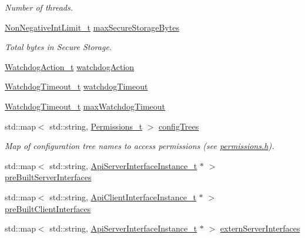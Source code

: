\begin{DoxyCompactItemize}
\begin{DoxyCompactList}\small\item\em Number of threads. \end{DoxyCompactList}\item 
\hyperlink{classmodel_1_1_non_negative_int_limit__t}{Non\+Negative\+Int\+Limit\+\_\+t} \hyperlink{structmodel_1_1_app__t_ad6a52e97dd3d0bf9b5704b1132887250}{max\+Secure\+Storage\+Bytes}
\begin{DoxyCompactList}\small\item\em Total bytes in Secure Storage. \end{DoxyCompactList}\item 
\hyperlink{classmodel_1_1_watchdog_action__t}{Watchdog\+Action\+\_\+t} \hyperlink{structmodel_1_1_app__t_a8de51fb11e6a6a74b85e1251b04ee0d0}{watchdog\+Action}
\item 
\hyperlink{classmodel_1_1_watchdog_timeout__t}{Watchdog\+Timeout\+\_\+t} \hyperlink{structmodel_1_1_app__t_ab1f362e168c428268f8cbf63b1fa4b49}{watchdog\+Timeout}
\item 
\hyperlink{classmodel_1_1_watchdog_timeout__t}{Watchdog\+Timeout\+\_\+t} \hyperlink{structmodel_1_1_app__t_a44607babc90ee42d69af83bfc57ad8e0}{max\+Watchdog\+Timeout}
\item 
std\+::map$<$ std\+::string, \hyperlink{structmodel_1_1_permissions__t}{Permissions\+\_\+t} $>$ \hyperlink{structmodel_1_1_app__t_a8465070467987d12cc3bdca51790503e}{config\+Trees}
\begin{DoxyCompactList}\small\item\em Map of configuration tree names to access permissions (see \hyperlink{permissions_8h}{permissions.\+h}). \end{DoxyCompactList}\item 
std\+::map$<$ std\+::string, \hyperlink{structmodel_1_1_api_server_interface_instance__t}{Api\+Server\+Interface\+Instance\+\_\+t} $\ast$ $>$ \hyperlink{structmodel_1_1_app__t_a899c9e3a6bbb06ebf0d174be423792ec}{pre\+Built\+Server\+Interfaces}
\item 
std\+::map$<$ std\+::string, \hyperlink{structmodel_1_1_api_client_interface_instance__t}{Api\+Client\+Interface\+Instance\+\_\+t} $\ast$ $>$ \hyperlink{structmodel_1_1_app__t_ae73e4308135b01391bacc2ff355de163}{pre\+Built\+Client\+Interfaces}
\item 
std\+::map$<$ std\+::string, \hyperlink{structmodel_1_1_api_server_interface_instance__t}{Api\+Server\+Interface\+Instance\+\_\+t} $\ast$ $>$ \hyperlink{structmodel_1_1_app__t_a27a2337b25bc501f7b52913bd95dd570}{extern\+Server\+Interfaces}

\end{DoxyCompactItemize}
